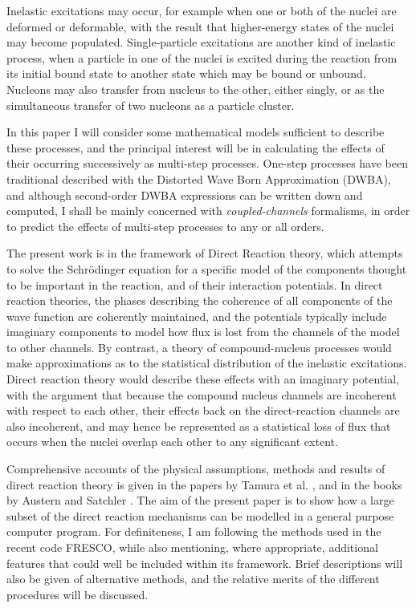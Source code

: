 \documentclass[11pt,a4paper]{article}
\begin{document}
Inelastic excitations may occur, for example when one or both of the
nuclei are deformed or deformable, with the result that
higher-energy states of the nuclei may become populated.
Single-particle excitations are another kind of inelastic
process, when a particle in one of the nuclei is excited during the reaction
from its initial bound state to another state which may be bound
or unbound.
Nucleons may also transfer from nucleus to the other, either singly,
or as the simultaneous transfer of two nucleons as a particle cluster.

In this paper I will consider some mathematical models sufficient to
describe these processes, and the principal interest will be in calculating
the effects of their occurring successively as multi-step
processes.  One-step processes have been traditional described with the
Distorted Wave Born Approximation (DWBA), and although second-order DWBA
expressions can be written down and computed, I shall be mainly concerned
with {\em coupled-channels} formalisms, in order to predict the
effects of multi-step processes to any or all orders.

The present work is in the framework of Direct Reaction theory, which
attempts to solve the Schr\"odinger equation for a specific model
of the components thought to be important in the reaction, and of their
interaction potentials.
In direct reaction theories, the phases describing the coherence
of all components of the wave function are coherently maintained,
and the potentials typically include imaginary components to model
how flux is lost from the channels of the model to other channels.
By contrast, a theory of compound-nucleus processes would make
approximations as to the statistical distribution of the inelastic excitations.
Direct reaction theory would describe these effects with an imaginary potential,
with the argument that because the compound
nucleus channels are incoherent with respect to each other, their effects
back on the direct-reaction channels are also incoherent, and may hence be
represented as a statistical loss of flux that occurs when the nuclei
overlap each other to any significant extent.

Comprehensive accounts of the physical assumptions, methods and results
of direct reaction theory is given in the papers by Tamura et al. \cite{tam74},
and in the books by Austern \cite{aust70} and Satchler \cite{SATCH83}.
The aim of the present paper is to show how a large subset of the
direct reaction mechanisms can be modelled in a general purpose computer
program.  For definiteness, I am following the methods used in the recent
code FRESCO, while also mentioning, where appropriate, additional features that
could well be included within its framework. Brief descriptions will also be
given of alternative methods, and the relative merits of the different
procedures will be discussed.
\end{document}
